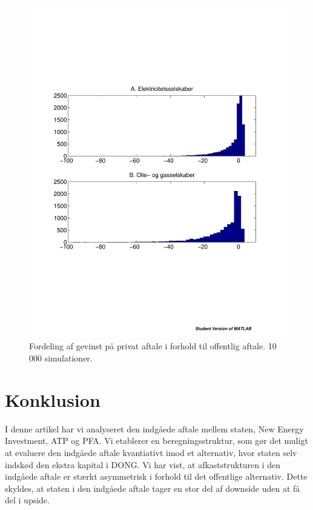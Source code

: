 \documentclass{article}
\begin{document}
\begin{figure}
\includegraphics[scale=0.8]{../matlab/figs/sim_return.pdf}
\caption{Fordeling af gevinst på privat aftale i forhold til offentlig aftale. 10 000 simulationer. }
\label{fig:sim}
\end{figure}

\FloatBarrier

\section{Konklusion}

I denne artikel har vi analyseret den indgåede aftale mellem staten, New Energy Investment, ATP og PFA. Vi etablerer en beregningsstruktur, som gør det muligt at evaluere den indgåede aftale kvantiativt imod et alternativ, hvor staten selv indskød den ekstra kapital i DONG. Vi har vist, at afkaststrukturen i den indgåede aftale er stærkt asymmetrisk i forhold til det offentlige alternativ. Dette skyldes, at staten i den indgåede aftale tager en stor del af downside uden at få del i upside. 
\end{document}
